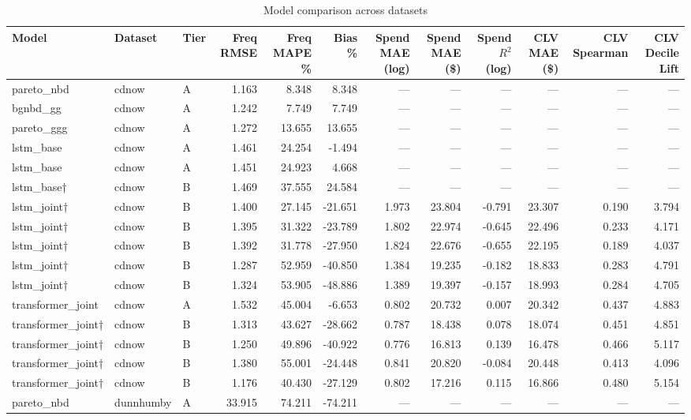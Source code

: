 \begin{table}
\caption{Model comparison across datasets}
\label{tab:model_comparison}
\begin{tabular}{lllrrrrrrrrr}
\toprule
Model & Dataset & Tier & Freq RMSE & Freq MAPE \% & Bias \% & Spend MAE (log) & Spend MAE (\$) & Spend $R^2$ (log) & CLV MAE (\$) & CLV Spearman & CLV Decile Lift \\
\midrule
pareto_nbd & cdnow & A & 1.163 & 8.348 & 8.348 & — & — & — & — & — & — \\
bgnbd_gg & cdnow & A & 1.242 & 7.749 & 7.749 & — & — & — & — & — & — \\
pareto_ggg & cdnow & A & 1.272 & 13.655 & 13.655 & — & — & — & — & — & — \\
lstm_base & cdnow & A & 1.461 & 24.254 & -1.494 & — & — & — & — & — & — \\
lstm_base & cdnow & A & 1.451 & 24.923 & 4.668 & — & — & — & — & — & — \\
lstm_base† & cdnow & B & 1.469 & 37.555 & 24.584 & — & — & — & — & — & — \\
lstm_joint† & cdnow & B & 1.400 & 27.145 & -21.651 & 1.973 & 23.804 & -0.791 & 23.307 & 0.190 & 3.794 \\
lstm_joint† & cdnow & B & 1.395 & 31.322 & -23.789 & 1.802 & 22.974 & -0.645 & 22.496 & 0.233 & 4.171 \\
lstm_joint† & cdnow & B & 1.392 & 31.778 & -27.950 & 1.824 & 22.676 & -0.655 & 22.195 & 0.189 & 4.037 \\
lstm_joint† & cdnow & B & 1.287 & 52.959 & -40.850 & 1.384 & 19.235 & -0.182 & 18.833 & 0.283 & 4.791 \\
lstm_joint† & cdnow & B & 1.324 & 53.905 & -48.886 & 1.389 & 19.397 & -0.157 & 18.993 & 0.284 & 4.705 \\
transformer_joint & cdnow & A & 1.532 & 45.004 & -6.653 & 0.802 & 20.732 & 0.007 & 20.342 & 0.437 & 4.883 \\
transformer_joint† & cdnow & B & 1.313 & 43.627 & -28.662 & 0.787 & 18.438 & 0.078 & 18.074 & 0.451 & 4.851 \\
transformer_joint† & cdnow & B & 1.250 & 49.896 & -40.922 & 0.776 & 16.813 & 0.139 & 16.478 & 0.466 & 5.117 \\
transformer_joint† & cdnow & B & 1.380 & 55.001 & -24.448 & 0.841 & 20.820 & -0.084 & 20.448 & 0.413 & 4.096 \\
transformer_joint† & cdnow & B & 1.176 & 40.430 & -27.129 & 0.802 & 17.216 & 0.115 & 16.866 & 0.480 & 5.154 \\
pareto_nbd & dunnhumby & A & 33.915 & 74.211 & -74.211 & — & — & — & — & — & — \\

\end{tabular}
\end{table}
